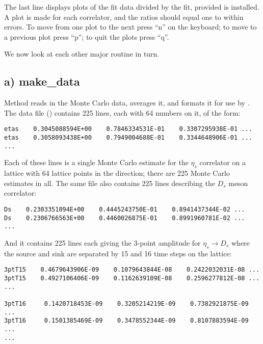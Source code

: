 \documentclass[letterpaper,10pt,english]{sphinxmanual}
\begin{document}
The last line displays plots of the fit data divided by the fit, provided
 is installed. A plot is made for each correlator, and the
ratios should equal one to within errors. To
move from one plot to the next press ``n'' on the keyboard; to move to a
previous plot press ``p''; to quit the plots press ``q''.

We now look at each other major routine in turn.


\subsection{a) make\_data}
\label{corrfitter:id3}
Method  reads in the Monte Carlo data, averages
it, and formats it for use by {\hyperref[corrfitter:corrfitter.CorrFitter]{}}. The data file ()
contains 225 lines,  each with 64 numbers on it, of the form:

\begin{Verbatim}[commandchars=\\\{\}]
etas    0.3045088594E+00    0.7846334531E-01    0.3307295938E-01 ...
etas    0.3058093438E+00    0.7949004688E-01    0.3344648906E-01 ...
...
\end{Verbatim}

Each of these lines is a single Monte Carlo estimate for the $\eta_s$
correlator on a lattice with 64 lattice points in the  direction;
there are 225 Monte Carlo estimates in all. The same file also contains
225 lines describing the $D_s$ meson correlator:

\begin{Verbatim}[commandchars=\\\{\}]
Ds    0.2303351094E+00    0.4445243750E-01    0.8941437344E-02 ...
Ds    0.2306766563E+00    0.4460026875E-01    0.8991960781E-02 ...
...
\end{Verbatim}

And it contains 225 lines each giving the 3-point amplitude for
$\eta_s \to D_s$
where the source and sink are separated by 15 and 16 time steps on the
lattice:

\begin{Verbatim}[commandchars=\\\{\}]
3ptT15    0.4679643906E-09    0.1079643844E-08    0.2422032031E-08 ...
3ptT15    0.4927106406E-09    0.1162639109E-08    0.2596277812E-08 ...
...

3ptT16     0.1420718453E-09    0.3205214219E-09    0.7382921875E-09 ...
3ptT16     0.1501385469E-09    0.3478552344E-09    0.8107883594E-09 ...
...
\end{Verbatim}
\end{document}
